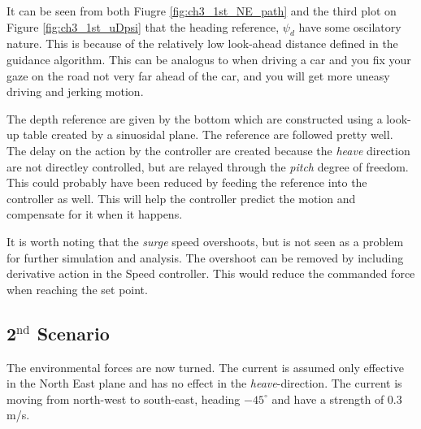 		It can be seen from both Fiugre \ref{fig:ch3_1st_NE_path} and the
		third plot on Figure \ref{fig:ch3_1st_uDpsi} that the heading reference, $\psi_d$ have some
		oscilatory nature. This is because of the relatively low look-ahead distance defined in the
		guidance algorithm. This can be analogus to when driving a car and you fix your gaze on
		the road not very far ahead of the car, and you will get more uneasy driving and jerking
		motion. 

		The depth reference are given by the bottom which are constructed using a look-up table
		created by a sinuosidal plane. The reference are followed pretty well. The delay on the
		action by the controller are created because the \textit{heave} direction are not directley
		controlled, but are relayed through the \textit{pitch} degree of freedom. This could probably
		have been reduced by feeding the reference into the controller as well. This will help the
		controller predict the motion and compensate for it when it happens.

		It is worth noting that the \textit{surge} speed overshoots, but is not seen as a problem for
		further simulation and analysis. The overshoot can be removed by including derivative action
		in the Speed controller. This would reduce the commanded force when reaching the set point.

	
	\subsection{2$^{\mathrm{nd}}$ Scenario}
		The environmental forces are now turned. The current is assumed only effective in the North
		East plane and has no effect in the \textit{heave}-direction. The current is moving from
		north-west to south-east, heading $-45^{\circ}$ and have a strength of $0.3$ m/s. 
		
